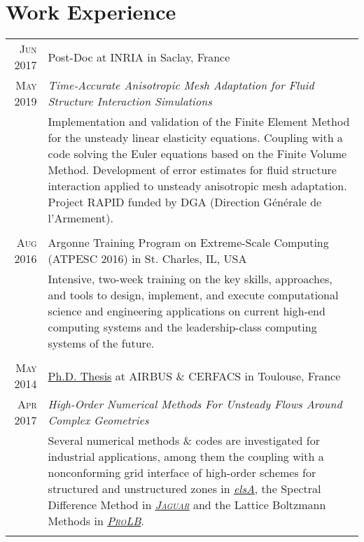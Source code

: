\documentclass[a4paper,10pt]{article}
\begin{document}
\section{Work Experience}
\begin{tabular}{r|p{15cm}}

\textsc{Jun 2017}   & Post-Doc at \textsc{INRIA} in Saclay, France \\
\textsc{May 2019}   & \emph{Time-Accurate Anisotropic Mesh Adaptation for Fluid Structure Interaction Simulations} \\
                    & \footnotesize{Implementation and validation of the Finite Element Method for the unsteady linear elasticity equations.
                    Coupling with a code solving the Euler equations based on the Finite Volume Method. Development of error estimates
                    for fluid structure interaction applied to unsteady anisotropic mesh adaptation.
                    Project RAPID funded by DGA (Direction G\'en\'erale de l'Armement). } \\
                    \multicolumn{2}{c}{} \\

\textsc{Aug 2016}   & Argonne Training Program on Extreme-Scale Computing (ATPESC 2016) in St. Charles, IL, USA \\
                    & \footnotesize{Intensive, two-week training on the key skills, approaches, and tools 
                    to design, implement, and execute computational science and engineering applications 
                    on current high-end computing systems and the leadership-class computing systems of the future.} \\
                    \multicolumn{2}{c}{} \\

\textsc{May 2014}   & \href{http://pages.saclay.inria.fr/julien.vanharen/files/phd.pdf}{Ph.D. Thesis} at \textsc{AIRBUS} \& \textsc{CERFACS} in Toulouse, France \\
\textsc{Apr 2017}   & \emph{High-Order Numerical Methods For Unsteady Flows Around Complex Geometries} \\
                    & \footnotesize{Several numerical methods \& codes are investigated for industrial applications, among them the coupling with a 
                    nonconforming grid interface of high-order schemes for structured and unstructured 
                    zones in \href{http://elsa.onera.fr}{\emph{elsA}},
                    the Spectral Difference Method in \href{http://www.cerfacs.fr/~puigt/jaguar.html}{\emph{\textsc{Jaguar}}}
                    and the Lattice Boltzmann Methods in \href{http://www.prolb-cfd.com}{\emph{\textsc{ProLB}}}.} \\
                    \multicolumn{2}{c}{} \\


\end{tabular}
\end{document}
